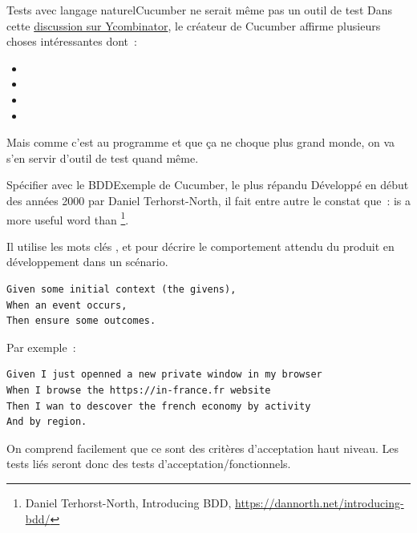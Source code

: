 \documentclass{beamer}
\begin{document}
    \begin{frame}{Tests avec langage naturel}{Cucumber ne serait même pas un outil de test}
        \transdissolve
        Dans cette \href{https://news.ycombinator.com/item?id=10194242}{discussion sur Ycombinator}, le créateur de Cucumber affirme plusieurs choses intéressantes dont~:
        \begin{itemize}
            \item {}
            \item {}
            \item {}
            \item {}
        \end{itemize}
        Mais comme c'est au programme et que ça ne choque plus grand monde, on va s'en servir d'outil de test quand même. 
    \end{frame}

    \begin{frame}[fragile]{Spécifier avec le BDD}{Exemple de Cucumber, le plus répandu}
        \transdissolve
        Développé en début des années 2000 par Daniel Terhorst-North, il fait entre autre le constat que~:  is a more useful word than \footnote{Daniel Terhorst-North, Introducing BDD, \url{https://dannorth.net/introducing-bdd/}}.

        Il utilise les mots clés ,  et  pour décrire le comportement attendu du produit en développement dans un scénario.
        \begin{lstlisting}
Given some initial context (the givens),
When an event occurs,
Then ensure some outcomes.
        \end{lstlisting}
        Par exemple~:
        \begin{lstlisting}
Given I just openned a new private window in my browser
When I browse the https://in-france.fr website
Then I wan to descover the french economy by activity
And by region.
        \end{lstlisting}
        On comprend facilement que ce sont des critères d'acceptation haut niveau.
        Les tests liés seront donc des tests d'acceptation/fonctionnels.
    \end{frame}
\end{document}
